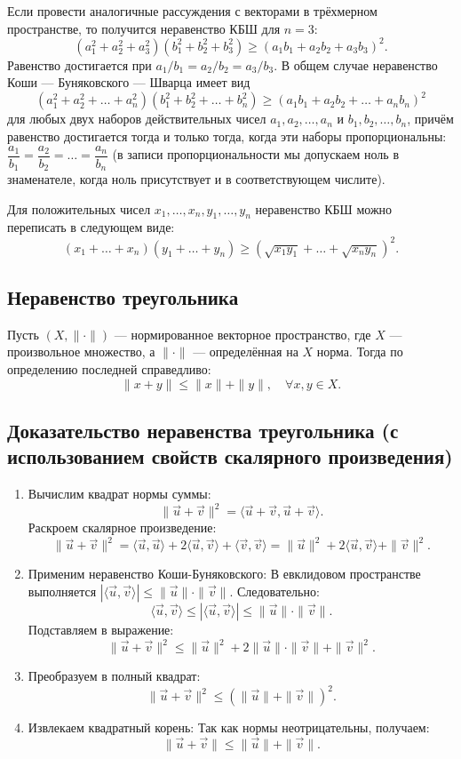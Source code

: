 \documentclass[12pt]{article}
\begin{document}
Если провести аналогичные рассуждения с векторами в трёхмерном пространстве, то получится неравенство КБШ для $n = 3$:
$$
(a_1^2 + a_2^2 + a_3^2)(b_1^2 + b_2^2 + b_3^2) \geq (a_1 b_1 + a_2 b_2 + a_3 b_3)^2.
$$
Равенство достигается при $a_1/b_1 = a_2/b_2 = a_3/b_3$.
В общем случае неравенство Коши — Буняковского — Шварца имеет вид
$$
(a_1^2 + a_2^2 + \dots + a_n^2)(b_1^2 + b_2^2 + \dots + b_n^2) \geq (a_1 b_1 + a_2 b_2 + \dots + a_n b_n)^2
$$
для любых двух наборов действительных чисел $a_1, a_2, \dots, a_n$ и $b_1, b_2, \dots, b_n$, причём равенство достигается тогда и только тогда, когда эти наборы пропорциональны: $\dfrac{a_1}{b_1} = \dfrac{a_2}{b_2} = \dots = \dfrac{a_n}{b_n}$ (в записи пропорциональности мы допускаем ноль в знаменателе, когда ноль присутствует и в соответствующем числите).

Для положительных чисел $x_1, \dots, x_n, y_1, \dots, y_n$ неравенство КБШ можно переписать в следующем виде:
$$
(x_1 + \dots + x_n)(y_1 + \dots + y_n) \geq \left( \sqrt{x_1 y_1} + \dots + \sqrt{x_n y_n} \right)^2.
$$

\subsection*{Неравенство треугольника}
Пусть $(X, \|\cdot\|)$ — нормированное векторное пространство, где $X$ — произвольное множество, а $\|\cdot\|$ — определённая на $X$ норма. Тогда по определению последней справедливо:
$$
\|x + y\| \leq \|x\| + \|y\|, \quad \forall x, y \in X.
$$
\subsection*{Доказательство неравенства треугольника (с использованием свойств скалярного произведения)}
\begin{enumerate}
    \item Вычислим квадрат нормы суммы:
    $$
    \|\vec{u} + \vec{v}\|^2 = \langle \vec{u} + \vec{v}, \vec{u} + \vec{v} \rangle.
    $$
    Раскроем скалярное произведение:
    $$
    \|\vec{u} + \vec{v}\|^2 = \langle \vec{u}, \vec{u} \rangle + 2\langle \vec{u}, \vec{v} \rangle + \langle \vec{v}, \vec{v} \rangle = \|\vec{u}\|^2 + 2\langle \vec{u}, \vec{v} \rangle + \|\vec{v}\|^2.
    $$
    
    \item Применим неравенство Коши-Буняковского:  
    В евклидовом пространстве выполняется $|\langle \vec{u}, \vec{v} \rangle| \leq \|\vec{u}\| \cdot \|\vec{v}\|$. Следовательно:
    $$
    \langle \vec{u}, \vec{v} \rangle \leq |\langle \vec{u}, \vec{v} \rangle| \leq \|\vec{u}\| \cdot \|\vec{v}\|.
    $$
    Подставляем в выражение:
    $$
    \|\vec{u} + \vec{v}\|^2 \leq \|\vec{u}\|^2 + 2\|\vec{u}\| \cdot \|\vec{v}\| + \|\vec{v}\|^2.
    $$
    
    \item Преобразуем в полный квадрат:
    $$
    \|\vec{u} + \vec{v}\|^2 \leq (\|\vec{u}\| + \|\vec{v}\|)^2.
    $$
    
    \item Извлекаем квадратный корень:  
    Так как нормы неотрицательны, получаем:
    $$
    \|\vec{u} + \vec{v}\| \leq \|\vec{u}\| + \|\vec{v}\|.
    $$
\end{enumerate}
\end{document}
